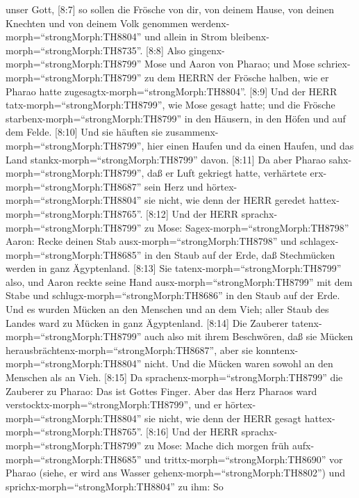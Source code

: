 unser Gott,  {[}8:7{]} so sollen die Frösche von dir, von
deinem Hause, von deinen Knechten und von deinem Volk genommen
werdenx-morph=``strongMorph:TH8804'' und allein in Strom
bleibenx-morph=``strongMorph:TH8735''.  {[}8:8{]} Also
gingenx-morph=``strongMorph:TH8799'' Mose und Aaron von Pharao; und Mose
schriex-morph=``strongMorph:TH8799'' zu dem HERRN der Frösche halben,
wie er Pharao hatte zugesagtx-morph=``strongMorph:TH8804''.
 {[}8:9{]} Und der HERR tatx-morph=``strongMorph:TH8799'',
wie Mose gesagt hatte; und die Frösche
starbenx-morph=``strongMorph:TH8799'' in den Häusern, in den Höfen und
auf dem Felde.  {[}8:10{]} Und sie häuften sie
zusammenx-morph=``strongMorph:TH8799'', hier einen Haufen und da einen
Haufen, und das Land stankx-morph=``strongMorph:TH8799'' davon.
 {[}8:11{]} Da aber Pharao
sahx-morph=``strongMorph:TH8799'', daß er Luft gekriegt hatte,
verhärtete erx-morph=``strongMorph:TH8687'' sein Herz und
hörtex-morph=``strongMorph:TH8804'' sie nicht, wie denn der HERR geredet
hattex-morph=``strongMorph:TH8765''.  {[}8:12{]} Und der
HERR sprachx-morph=``strongMorph:TH8799'' zu Mose:
Sagex-morph=``strongMorph:TH8798'' Aaron: Recke deinen Stab
ausx-morph=``strongMorph:TH8798'' und
schlagex-morph=``strongMorph:TH8685'' in den Staub auf der Erde, daß
Stechmücken werden in ganz Ägyptenland.  {[}8:13{]} Sie
tatenx-morph=``strongMorph:TH8799'' also, und Aaron reckte seine Hand
ausx-morph=``strongMorph:TH8799'' mit dem Stabe und
schlugx-morph=``strongMorph:TH8686'' in den Staub auf der Erde. Und es
wurden Mücken an den Menschen und an dem Vieh; aller Staub des Landes
ward zu Mücken in ganz Ägyptenland.  {[}8:14{]} Die
Zauberer tatenx-morph=``strongMorph:TH8799'' auch also mit ihrem
Beschwören, daß sie Mücken herausbrächtenx-morph=``strongMorph:TH8687'',
aber sie konntenx-morph=``strongMorph:TH8804'' nicht. Und die Mücken
waren sowohl an den Menschen als an Vieh.  {[}8:15{]} Da
sprachenx-morph=``strongMorph:TH8799'' die Zauberer zu Pharao: Das ist
Gottes Finger. Aber das Herz Pharaos ward
verstocktx-morph=``strongMorph:TH8799'', und er
hörtex-morph=``strongMorph:TH8804'' sie nicht, wie denn der HERR gesagt
hattex-morph=``strongMorph:TH8765''.  {[}8:16{]} Und der
HERR sprachx-morph=``strongMorph:TH8799'' zu Mose: Mache dich morgen
früh aufx-morph=``strongMorph:TH8685'' und
trittx-morph=``strongMorph:TH8690'' vor Pharao (siehe, er wird ans
Wasser gehenx-morph=``strongMorph:TH8802'') und
sprichx-morph=``strongMorph:TH8804'' zu ihm: So

